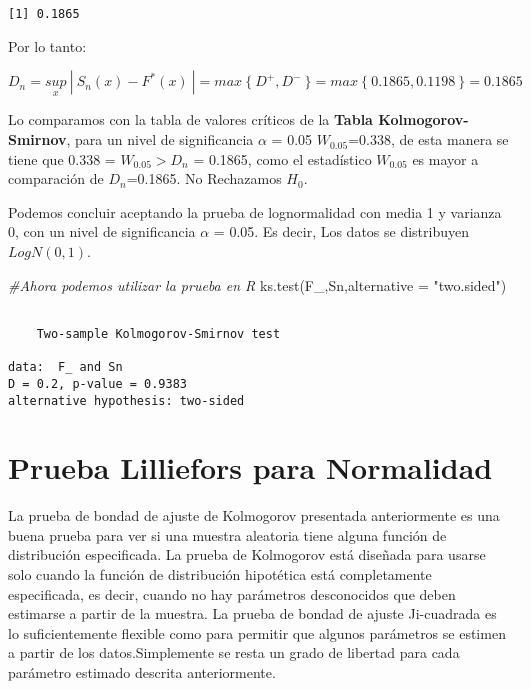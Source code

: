 \documentclass[
  a4paper,
  oneside,
  openany]{book}
\newenvironment{Shaded}{\begin{snugshade}}{\end{snugshade}}
\newcommand{\AttributeTok}[1]{\textcolor[rgb]{0.77,0.63,0.00}{#1}}
\newcommand{\CommentTok}[1]{\textcolor[rgb]{0.56,0.35,0.01}{\textit{#1}}}
\newcommand{\FunctionTok}[1]{\textcolor[rgb]{0.00,0.00,0.00}{#1}}
\newcommand{\NormalTok}[1]{#1}
\newcommand{\StringTok}[1]{\textcolor[rgb]{0.31,0.60,0.02}{#1}}
\begin{document}
\begin{verbatim}
[1] 0.1865
\end{verbatim}

Por lo tanto:

\[D_{n}=\underset{x}{sup} \ | \ S_{n}(x)-F^*(x)\ |=max\ \{\ D^+,D^- \ \}=max \ \{ \ 0.1865,0.1198 \ \}=0.1865\]

Lo comparamos con la tabla de valores críticos de la \textbf{Tabla Kolmogorov-Smirnov}, para un nivel de significancia \(\alpha\) = 0.05
\(W_{0.05}\)=0.338, de esta manera se tiene que 0.338 = \(W_{0.05} > D_{n}\) = 0.1865, como el estadístico \(W_{0.05}\) es mayor a comparación de \(D_{n}\)=0.1865.
No Rechazamos \(H_0\).

Podemos concluir aceptando la prueba de lognormalidad con media 1 y varianza 0, con un nivel de significancia \(\alpha\) = 0.05. Es decir, Los datos se distribuyen \(LogN(0,1)\).

\begin{Shaded}
\begin{Highlighting}[]
\CommentTok{\#Ahora podemos utilizar la prueba en R}
\FunctionTok{ks.test}\NormalTok{(F\_,Sn,}\AttributeTok{alternative =} \StringTok{"two.sided"}\NormalTok{)}
\end{Highlighting}
\end{Shaded}

\begin{verbatim}

    Two-sample Kolmogorov-Smirnov test

data:  F_ and Sn
D = 0.2, p-value = 0.9383
alternative hypothesis: two-sided
\end{verbatim}

\hypertarget{prueba-lilliefors-para-normalidad}{%
\chapter{Prueba Lilliefors para Normalidad}\label{prueba-lilliefors-para-normalidad}}

La prueba de bondad de ajuste de Kolmogorov presentada anteriormente es una buena prueba para ver si una muestra aleatoria tiene alguna función de distribución especificada. La prueba de Kolmogorov está diseñada para usarse solo cuando la función de distribución hipotética está completamente especificada, es decir, cuando no hay parámetros desconocidos que deben estimarse a partir de la muestra.
La prueba de bondad de ajuste Ji-cuadrada es lo suficientemente flexible como para permitir que algunos parámetros se estimen a partir de los datos.Simplemente se resta un grado de libertad para cada parámetro estimado descrita anteriormente.
\end{document}
